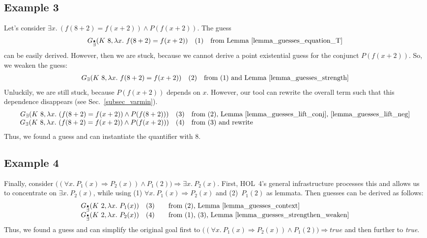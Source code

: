 \documentclass[a4paper,12pt,DIV=12,oneside]{scrbook}
\theoremstyle{definition}
\theoremstyle{remark}
\newcommand{\GE}{\ensuremath{G_\exists}}
\newcommand{\GEP}{\ensuremath{G_{\accentset{\bullet}{\exists}}}}
\begin{document}
\subsection{Example 3}
Let's consider $\exists x.\ (f (8 + 2) = f (x + 2)) \wedge P (f (x + 2))$. The guess
\[\begin{array}{cc@{\quad}l}
\GEP(K\ 8, \lambda x.\ f (8 + 2) = f (x + 2)) & \text{(1)} & \text{from Lemma~\ref{lemma_guesses_equation_T}} \\
\end{array}
\]
can be easily derived. However, then we are stuck, because we cannot derive a point existential guess for the conjunct $P (f (x + 2))$.
So, we weaken the guess:
\[\begin{array}{cc@{\quad}l}
\GE(K\ 8, \lambda x.\ f (8 + 2) = f (x + 2)) & \text{(2)} & \text{from (1) and Lemma~\ref{lemma_guesses_strength}} \\
\end{array}
\]
Unluckily, we are still stuck, because $P (f (x + 2))$ depends on $x$. However, our tool can rewrite the overall term
such that this dependence disappears (see Sec.~\ref{subsec_varmin}).
\[\begin{array}{cc@{\quad}l}
\GE(K\ 8, \lambda x.\ (f (8 + 2) = f (x + 2)) \wedge P(f(8 + 2))) & \text{(3)} & \text{from (2), Lemma~\ref{lemma_guesses_lift_conj},
\ref{lemma_guesses_lift_neg}} \\
\GE(K\ 8, \lambda x.\ (f (8 + 2) = f (x + 2)) \wedge P(f(x + 2))) & \text{(4)} & \text{from (3) and rewrite}
\end{array}
\]
Thus, we found a guess and can instantiate the quantifier with 8.

\subsection{Example 4}
Finally, consider $\big((\forall x.\ P_1(x) \Rightarrow P_2(x)) \wedge P_1(2)\big) \Longrightarrow \exists x.\ P_2(x)$. 
First, HOL~4's general infrastructure processes this and allows us to concentrate on 
$\exists x.\ P_2(x)$, while using (1) $\forall x.\ P_1(x) \Rightarrow P_2(x)$ and (2)~$P_1(2)$ as lemmata.
Then guesses can be derived as follows:
\[\begin{array}{cc@{\qquad}l}
\GEP(K\ 2, \lambda x.\ P_1(x)) & \text{(3)} & \text{from (2), Lemma~\ref{lemma_guesses_context}} \\
\GEP(K\ 2, \lambda x.\ P_2(x)) & \text{(4)} & \text{from (1), (3), Lemma~\ref{lemma_guesses_strengthen_weaken}}
\end{array}
\]
Thus, we found a guess and can simplify the original goal first to 
$\big((\forall x.\ P_1(x) \Rightarrow P_2(x)) \wedge P_1(2)\big) \Longrightarrow \textit{true}$ and then further to
\textit{true}.
\end{document}
